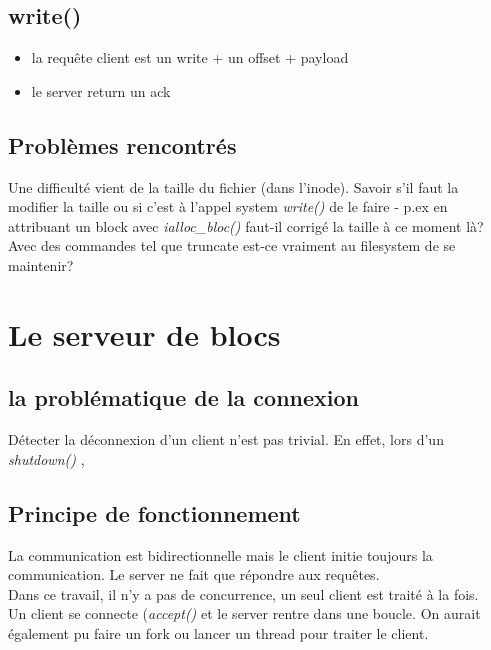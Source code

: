 \documentclass[a4paper,12pt]{article}
\begin{document}
\subsection*{write()}

\begin{itemize}
\item la requête client est un write + un offset + payload
\item le server return un ack
\end{itemize}

\subsection{Problèmes rencontrés}

Une difficulté vient de la taille du fichier (dans l'inode). Savoir s'il faut la modifier la taille ou si c'est à l'appel system \emph{write()} de le faire - p.ex en attribuant un block avec \emph{ialloc\_bloc()} faut-il corrigé la taille à ce moment là? Avec des commandes tel que truncate est-ce vraiment au filesystem de se maintenir?


\vspace{1cm}

\section{Le serveur de blocs}


\subsection{la problématique de la connexion}

Détecter la déconnexion d'un client n'est pas trivial. En effet, lors d'un \emph{shutdown()} , 

\subsection{Principe de fonctionnement}

La communication est bidirectionnelle mais le client initie toujours la communication. Le server ne fait que répondre aux requêtes.\\

Dans ce travail, il n'y a pas de concurrence, un seul client est traité à la fois.\\

Un client se connecte (\emph{accept()} et le server rentre dans une boucle. On aurait également pu faire un fork ou lancer un thread pour traiter le client.\\
\end{document}
